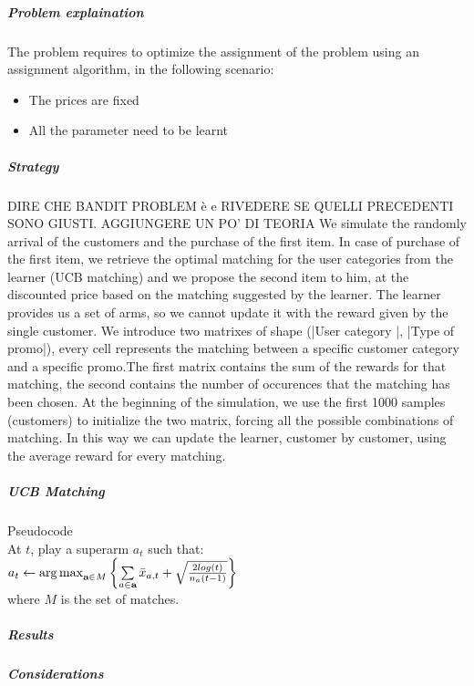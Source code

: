 \subparagraph*{Problem explaination}
The problem requires to optimize the assignment of the problem using an assignment algorithm, in the following scenario:
\begin{itemize}
	\item The prices are fixed
	\item All the parameter need to be learnt
\end{itemize}
\subparagraph*{Strategy}
DIRE CHE BANDIT PROBLEM è e RIVEDERE SE QUELLI PRECEDENTI SONO GIUSTI. AGGIUNGERE UN PO' DI TEORIA
We simulate the randomly arrival of the customers and the purchase of the first item. In case of purchase of the first item, we retrieve the optimal matching for the user categories from the learner (UCB matching) and we propose the second item to him, at the discounted price based on the matching suggested by the learner. The learner provides us a set of arms, so we cannot update it with the reward given by the single customer. We introduce two matrixes of shape (|User category |, |Type of promo|), every cell represents the matching between a specific customer category and a specific promo.The first matrix contains the sum of the rewards for that matching, the second contains the number of occurences that the matching has been chosen. At the beginning of the simulation, we use the first 1000 samples (customers) to initialize the two matrix, forcing all the possible combinations of matching. In this way we can update the learner, customer by customer, using the average reward for every matching. 
\subparagraph*{UCB Matching}
Pseudocode\\
At $t$, play a superarm $a_{t}$ such that:\\
$a_{t} \leftarrow \operatorname{arg\,max}\limits_{\textbf{a} \in M}{\left\{\sum\limits_{a \in \textbf{a}}\bar{x}_{a,t} + \sqrt{\frac{2 log(t)}{{n_{a}(t-1)}} }\right\}}$ \\
where $M$ is the set of matches.
\subparagraph*{Results}
\subparagraph*{Considerations}